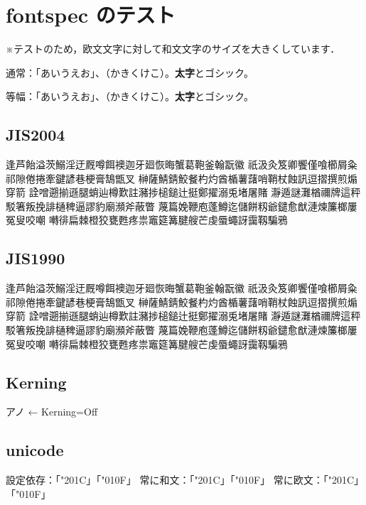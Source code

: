 \documentclass{article}
\begin{document}
\section{fontspec のテスト}

※テストのため，欧文文字に対して和文文字のサイズを大きくしています．

\noindent 通常：「あいうえお」、（かきくけこ）。{\bf 太字}と{\gt ゴシック}。

{
\noindent 等幅：「あいうえお」、（かきくけこ）。{\bf 太字}と{\gt ゴシック}。
}

\subsection{JIS2004}
逢芦飴溢茨鰯淫迂厩噂餌襖迦牙廻恢晦蟹葛鞄釜翰翫徽
祇汲灸笈卿饗僅喰櫛屑粂祁隙倦捲牽鍵諺巷梗膏鵠甑叉
榊薩鯖錆鮫餐杓灼酋楯薯藷哨鞘杖蝕訊逗摺撰煎煽穿箭
詮噌遡揃遜腿蛸辿樽歎註瀦捗槌鎚辻挺鄭擢溺兎堵屠賭
瀞遁謎灘楢禰牌這秤駁箸叛挽誹樋稗逼謬豹廟瀕斧蔽瞥
蔑篇娩鞭庖蓬鱒迄儲餅籾爺鑓愈猷漣煉簾榔屢冤叟咬嘲
囀徘扁棘橙狡甕甦疼祟竈筵篝腱艘芒虔蜃蠅訝靄靱騙鴉

\subsection{JIS1990}
{\ipajisninety
逢芦飴溢茨鰯淫迂厩噂餌襖迦牙廻恢晦蟹葛鞄釜翰翫徽
祇汲灸笈卿饗僅喰櫛屑粂祁隙倦捲牽鍵諺巷梗膏鵠甑叉
榊薩鯖錆鮫餐杓灼酋楯薯藷哨鞘杖蝕訊逗摺撰煎煽穿箭
詮噌遡揃遜腿蛸辿樽歎註瀦捗槌鎚辻挺鄭擢溺兎堵屠賭
瀞遁謎灘楢禰牌這秤駁箸叛挽誹樋稗逼謬豹廟瀕斧蔽瞥
蔑篇娩鞭庖蓬鱒迄儲餅籾爺鑓愈猷漣煉簾榔屢冤叟咬嘲
囀徘扁棘橙狡甕甦疼祟竈筵篝腱艘芒虔蜃蠅訝靄靱騙鴉
}

\vspace{1\zw}

\subsection{Kerning}
{

アノ ← Kerning=Off

}

\subsection{unicode}

設定依存：「\char"201C」「\char"010F」%
常に和文：「\ltjjachar"201C」「\ltjjachar"010F」%
常に欧文：「\ltjalchar"201C」「\ltjalchar"010F」%
\end{document}
